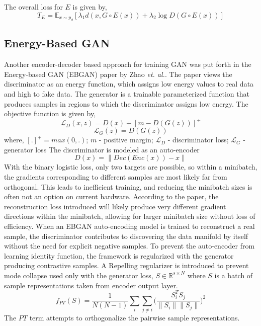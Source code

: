 The overall loss for $E$ is given by, 
$$T_{E} = \mathbb{E}_{x \sim p_{d}}[\lambda_{1} d(x, G\circ E(x)) + \lambda_{2}\log D(G \circ E(x))]$$


\subsection*{Energy-Based GAN \citep{eb-gan}}
Another encoder-decoder based approach for training GAN was put forth in the Energy-based GAN (EBGAN) paper by \citep{eb-gan} Zhao \emph{et. al.}. The paper views the discriminator as an energy function, which assigns low energy values to real data and high to fake data. The generator is a trainable parameterized function that produces samples in regions to which the discriminator assigns low energy. The objective function is given by, $$\mathcal{L}_{D}(x,z) = D(x) + [m-D(G(z))]^+$$$$\mathcal{L}_{G}(z) = D(G(z))$$ where, $[.]^+ = max(0,.)$; $m$ - positive margin; $\mathcal{L}_{D}$ - discriminator loss; $\mathcal{L}_{G}$ - generator loss
The discriminator is modeled as an auto-encoder  $$D(x) = \parallel Dec(Enc(x)) - x \parallel $$
 With the binary logistic loss, only two targets are possible, so within a minibatch, the gradients corresponding to different samples are most likely far from orthogonal. This leads to inefficient training, and reducing the minibatch sizes is often not an option on current hardware. According to the paper, the reconstruction loss introduced will likely produce very different gradient directions within the minibatch, allowing for larger minibatch size without loss of efficiency. When an EBGAN auto-encoding model is trained to reconstruct a real sample, the discriminator contributes to discovering the data manifold by itself without the need for explicit negative samples. To prevent the auto-encoder from learning identity function, the framework is regularized with the generator producing contrastive samples. A Repelling regularizer is introduced to prevent mode collapse used only with the generator loss, $S \in \mathbb{R}^{s\times N}$ where $S$ is a batch of sample representations taken from encoder output layer. $$f_{PT}(S) = \frac{1}{N(N-1)}\sum_{i} \sum_{j\neq i} \bigg( \frac{S_{i}^T S_{j}}{\parallel S_{i}\parallel \parallel S_{j}\parallel} \bigg)^2 $$ The $PT$ term attempts to orthogonalize the pairwise sample representations.



